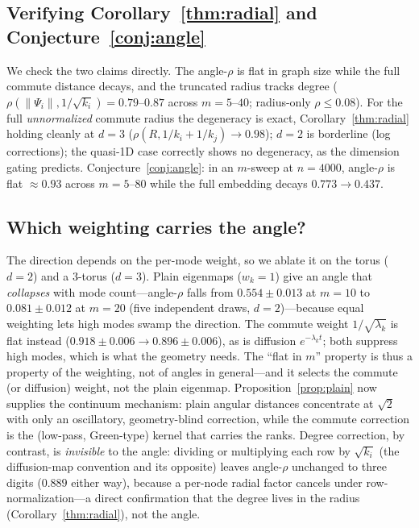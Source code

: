 \documentclass[review]{siamart220329}
\begin{document}
\subsection{\texorpdfstring{Verifying Corollary~\ref{thm:radial} and
Conjecture~\ref{conj:angle}}{Verifying the degeneracy corollary and the angular
conjecture}}\label{sec:verify}
We check the two claims directly. The angle-$\rho$ is flat in graph size
while the full commute distance decays, and
the truncated radius tracks degree ($\rho(\lVert\Psi_i\rVert,1/\sqrt{k_i})=
0.79$--$0.87$ across $m=5$--$40$; radius-only $\rho\le0.08$). For the full
\emph{unnormalized} commute radius the degeneracy is exact,
Corollary~\ref{thm:radial} holding cleanly
at $d=3$ ($\rho(R,1/k_i+1/k_j)\to0.98$); $d=2$ is borderline (log corrections);
the quasi-1D case correctly shows no degeneracy, as the dimension gating
predicts. Conjecture~\ref{conj:angle}: in an $m$-sweep at $n=4000$, angle-$\rho$
is flat $\approx0.93$ across $m=5$--$80$ while the full embedding decays
$0.773\to0.437$.

\subsection{Which weighting carries the angle?}\label{sec:ablation}
The direction depends on the per-mode weight, so we ablate it on the torus
($d{=}2$) and a $3$-torus ($d{=}3$). Plain eigenmaps ($w_k{=}1$) give an angle
that \emph{collapses} with mode count---angle-$\rho$ falls from $0.554\pm0.013$ at
$m{=}10$ to $0.081\pm0.012$ at $m{=}20$ (five independent draws, $d{=}2$)---because
equal weighting lets high modes swamp the direction. The commute weight
$1/\sqrt{\lambda_k}$ is flat instead ($0.918\pm0.006\to0.896\pm0.006$), as is
diffusion $e^{-\lambda_k t}$; both suppress high modes,
which is what the geometry needs. The ``flat in $m$'' property is thus a property
of the weighting, not of angles in general---and it selects the commute (or
diffusion) weight, not the plain eigenmap. Proposition~\ref{prop:plain} now
supplies the continuum mechanism: plain angular distances concentrate at
$\sqrt2$ with only an oscillatory, geometry-blind correction, while the
commute correction is the (low-pass, Green-type) kernel that carries the
ranks. Degree correction, by contrast, is
\emph{invisible} to the angle: dividing or multiplying each row by $\sqrt{k_i}$
(the diffusion-map convention and its opposite) leaves angle-$\rho$ unchanged to
three digits ($0.889$ either way), because a per-node radial factor cancels under
row-normalization---a direct confirmation that the degree lives in the radius
(Corollary~\ref{thm:radial}), not the angle.
\end{document}
